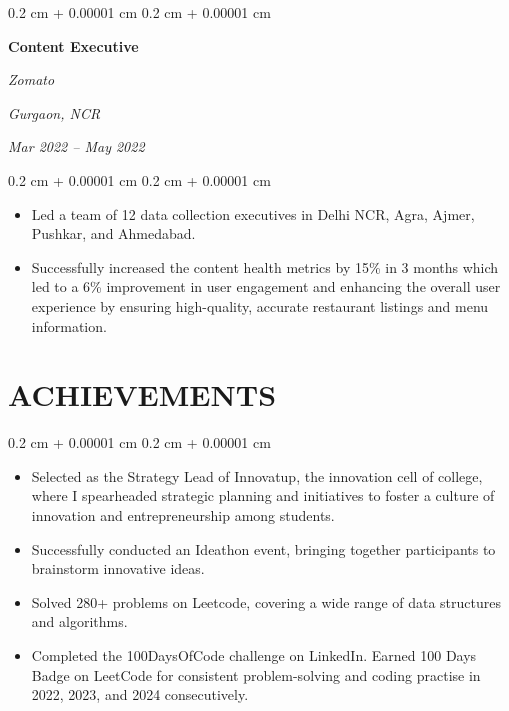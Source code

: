 \documentclass[10pt, letterpaper]{article}
\newenvironment{highlights}{
    \begin{itemize}[
        topsep=0.10 cm,
        parsep=0.10 cm,
        partopsep=0pt,
        itemsep=0pt,
        leftmargin=0.4 cm + 10pt
    ]
}{
    \end{itemize}
} %
\newenvironment{onecolentry}{
    \begin{adjustwidth}{
        0.2 cm + 0.00001 cm
    }{
        0.2 cm + 0.00001 cm
    }
}{
    \end{adjustwidth}
} %
\newenvironment{twocolentry}[2][]{
    \onecolentry
    \def\secondColumn{#2}
    \setcolumnwidth{\fill, 4.5 cm}
    \begin{paracol}{2}
}{
    \switchcolumn \raggedleft \secondColumn
    \end{paracol}
    \endonecolentry
} %
\begin{document}
        \vspace{0.2 cm}

        \begin{twocolentry}{
        \textit{Gurgaon, NCR}    
            
        \textit{Mar 2022 – May 2022}}
            \textbf{Content Executive}
            
            \textit{Zomato}
        \end{twocolentry}

        \vspace{0.10 cm}
        \begin{onecolentry}
            \begin{highlights}
                \item Led a team of 12 data collection executives in Delhi NCR, Agra, Ajmer, Pushkar, and Ahmedabad.
                \item Successfully increased the content health metrics by 15\% in 3 months which led to a 6\% improvement in user engagement and enhancing the overall user experience by ensuring high-quality, accurate restaurant listings and menu information.
            \end{highlights}
        \end{onecolentry}



\section{ACHIEVEMENTS}


        \vspace{0.10 cm}
        \begin{onecolentry}
            \begin{highlights}
                \item Selected as the Strategy Lead of Innovatup, the innovation cell of college, where I spearheaded strategic planning and initiatives to foster a culture of innovation and entrepreneurship among students.
                \item Successfully conducted an Ideathon event, bringing together participants to brainstorm innovative ideas.
                \item Solved 280+ problems on Leetcode, covering a wide range of data structures and algorithms. 
                \item Completed the 100DaysOfCode challenge on LinkedIn. Earned 100 Days Badge on LeetCode for consistent problem-solving and coding practise in 2022, 2023, and 2024 consecutively.
            \end{highlights}
        \end{onecolentry}
\end{document}
